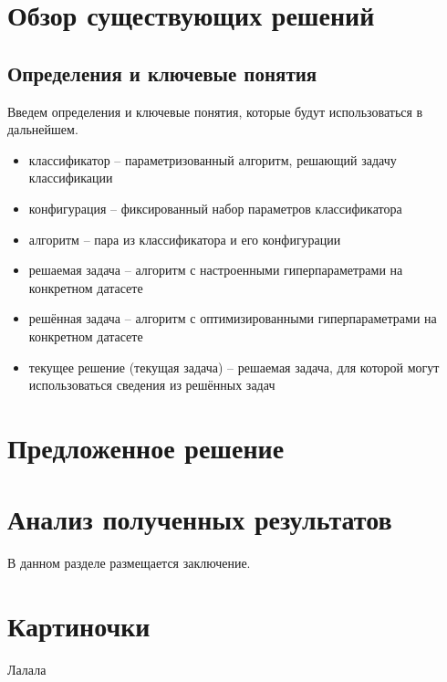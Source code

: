 \documentclass[times,specification,annotation]{itmo-student-thesis}
\begin{document}
	
	\chapter{Обзор существующих решений}
	\startrelatedwork
	
	\section{Определения и ключевые понятия}
	Введем определения и ключевые понятия, которые будут использоваться в дальнейшем.
	\begin{itemize}
		\item классификатор -- параметризованный алгоритм, решающий задачу классификации
		\item конфигурация -- фиксированный набор параметров классификатора
		\item алгоритм -- пара из классификатора и его конфигурации
		\item решаемая задача -- алгоритм с настроенными гиперпараметрами на конкретном датасете
		\item решённая задача -- алгоритм с оптимизированными гиперпараметрами на конкретном датасете
		\item текущее решение (текущая задача) -- решаемая задача, для которой могут использоваться сведения из решённых задач
	\end{itemize}
	\chapterconclusion
	
	
	\chapter{Предложенное решение}
	\chapterconclusion
	
	\chapter{Анализ полученных результатов}
	\chapterconclusion
	
	
	\startconclusionpage
	В данном разделе размещается заключение.
	
	\printmainbibliography
	
	
	\appendix
	\chapter{Картиночки}
	Лалала
	
\end{document}
